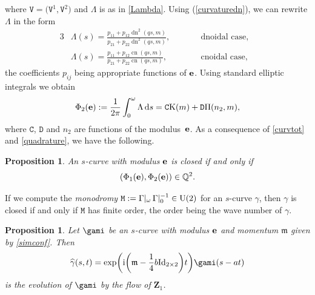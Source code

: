 \documentclass[10pt,a4paper]{amsart}
\def\ri{\mathrm{i}}
\newcommand\VZ{\mathbf Z}
\newcommand{\ds}{\,{\rm d}s}
\def\gam{\gamma} %
\newcommand\be{{\bf e}}
\newcommand\gamf{\widehat{\gam}} %
\newcommand\cn{\operatorname{cn}}
\newcommand\dn{\operatorname{dn}}
\numberwithin{equation}{section}
\newtheorem{Proposition}[Theorem]{Proposition}
 { \theoremstyle{definition}
\newtheorem{Definition}[Theorem]{Definition}
\newtheorem{Note}[Theorem]{Note}
\newtheorem{Example}[Theorem]{Example}
\newtheorem{Remark}[Theorem]{Remark} }
\begin{document}
where ${\mathtt V}=\bigl({\mathtt V}^1,{\mathtt V}^2\bigr)$ and $\Lambda$ is as in \eqref{Lambda}.
Using (\ref{curvaturedn}), we can rewrite $\Lambda$ in the form
\begin{alignat*}{3}%
&\Lambda(s)=
 \frac{p_{11}+p_{12}\dn^2(qs,m)}{p_{21}+p_{22}\dn^2(qs,m)},\qquad && \text{dnoidal case,}& \\
&\Lambda(s)= \frac{p_{11}+p_{12}\cn(qs,m)}{p_{21}+p_{22}\cn(qs,m)},\qquad && \text{cnoidal case},&
\end{alignat*}
the coefficients $p_{ij}$ being appropriate functions of $\be$. Using standard elliptic integrals we obtain
\[
\Phi_2(\be):=\frac{1}{2\pi}\int_0^{\omega} \Lambda \ds={\mathtt C}{\rm K}(m)+{\mathtt D}\Pi(n_2,m),
\]
where ${\mathtt C}$, ${\mathtt D}$ and $n_2$ are functions of the modulus~$\be$. As a consequence of \eqref{curvtot} and \eqref{quadrature}, we have the following.


\begin{Proposition} An $s$-curve with modulus $\be$ is closed if and only if
\[(\Phi_1(\be),\Phi_2(\be))\in {\mathbb Q}^2.\]\end{Proposition}


\begin{Remark}%
If we compute the {\it monodromy} ${\mathtt M}:=\Gamma|_{\omega}\, \Gamma|_0^{-1}\in {\rm U}(2)$ for an $s$-curve $\gam$, then $\gam$ is closed if and only if ${\mathtt M}$ has finite order, the order
being the wave number of $\gam$.\end{Remark}


\begin{Proposition} \label{timeevolution}Let $\gami$ be an $s$-curve with modulus $\be$ and momentum ${\mathfrak m}$ given by \eqref{simconf}.
Then
\begin{equation*}%
\gamf(s,t)= \exp \biggl(\ri \biggl({\mathfrak m}-\frac14 b{\rm Id}_{2\times 2}\biggr)t\biggr) \gami(s-at)
\end{equation*}
is the evolution of $\gami$ by the flow of $\VZ_1$. \end{Proposition}
\end{document}
